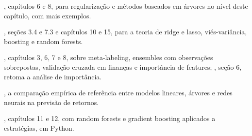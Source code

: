 \begin{leituras}
  \item \citet{james2021}, capítulos 6 e 8, para regularização e métodos baseados em árvores no nível deste capítulo, com mais exemplos.
  \item \citet{hastie2009}, seções 3.4 e 7.3 e capítulos 10 e 15, para a teoria de ridge e lasso, viés-variância, boosting e random forests.
  \item \citet{lopezdeprado2018}, capítulos 3, 6, 7 e 8, sobre meta-labeling, ensembles com observações sobrepostas, validação cruzada em finanças e importância de features; \citet{lopezdeprado2020}, seção 6, retoma a análise de importância.
  \item \citet{gu2020}, a comparação empírica de referência entre modelos lineares, árvores e redes neurais na previsão de retornos.
  \item \citet{jansen2020}, capítulos 11 e 12, com random forests e gradient boosting aplicados a estratégias, em Python.
\end{leituras}
